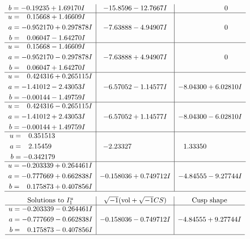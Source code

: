 \documentclass[1p]{elsarticle_modified}
\theoremstyle{definition}
\newcommand{\I}{\sqrt{-1}}
\begin{document}
$$\begin{array}{c|c|c}
\begin{aligned}
b &= -0.19235 + 1.69170 I\end{aligned}
 & -15.8596 - 12.7667 I & \phantom{-0.000000 } 0 \\ \hline\begin{aligned}
u &= \phantom{-}0.15668 + 1.46609 I \\
a &= -0.952170 + 0.297878 I \\
b &= \phantom{-}0.06047 - 1.64270 I\end{aligned}
 & -7.63888 - 4.94907 I & \phantom{-0.000000 } 0 \\ \hline\begin{aligned}
u &= \phantom{-}0.15668 - 1.46609 I \\
a &= -0.952170 - 0.297878 I \\
b &= \phantom{-}0.06047 + 1.64270 I\end{aligned}
 & -7.63888 + 4.94907 I & \phantom{-0.000000 } 0 \\ \hline\begin{aligned}
u &= \phantom{-}0.424316 + 0.265115 I \\
a &= -1.41012 - 2.43053 I \\
b &= -0.00144 - 1.49759 I\end{aligned}
 & -6.57052 - 1.14577 I & -8.04300 + 6.02810 I \\ \hline\begin{aligned}
u &= \phantom{-}0.424316 - 0.265115 I \\
a &= -1.41012 + 2.43053 I \\
b &= -0.00144 + 1.49759 I\end{aligned}
 & -6.57052 + 1.14577 I & -8.04300 - 6.02810 I \\ \hline\begin{aligned}
u &= \phantom{-}0.351513\phantom{ +0.000000I} \\
a &= \phantom{-}2.15459\phantom{ +0.000000I} \\
b &= -0.342179\phantom{ +0.000000I}\end{aligned}
 & -2.23327\phantom{ +0.000000I} & \phantom{-}1.33350\phantom{ +0.000000I} \\ \hline\begin{aligned}
u &= -0.203339 + 0.264461 I \\
a &= -0.777669 + 0.662838 I \\
b &= \phantom{-}0.175873 + 0.407856 I\end{aligned}
 & -0.158036 + 0.749712 I & -4.84555 - 9.27744 I\\
 \hline 
 \end{array}$$\newpage$$\begin{array}{c|c|c}  
\text{Solutions to }I^u_{1}& \I (\text{vol} + \sqrt{-1}CS) & \text{Cusp shape}\\
 \hline 
\begin{aligned}
u &= -0.203339 - 0.264461 I \\
a &= -0.777669 - 0.662838 I \\
b &= \phantom{-}0.175873 - 0.407856 I\end{aligned}
 & -0.158036 - 0.749712 I & -4.84555 + 9.27744 I\\
 \hline 
 \end{array}$$\newpage\newpage\renewcommand{\arraystretch}{1}
\end{document}
